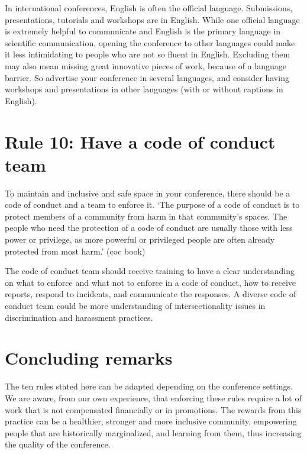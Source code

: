 \documentclass[10pt,letterpaper]{article}
\begin{document}
In international conferences, English is often the official language. Submissions, presentations, tutorials and workshops are in English. While one official language is extremely helpful to communicate and English is the primary language in scientific communication, opening the conference to other languages could make it less intimidating to people who are not so fluent in English. Excluding them may also mean missing great innovative pieces of work, because of a language barrier. So advertise your conference in several languages, and consider having workshops and presentations in other languages (with or without captions in English). 

\section*{Rule 10: Have a code of conduct team}

To maintain and inclusive and safe space in your conference, there should be a code of conduct and a team to enforce it. `The purpose of a code of conduct is to protect members of a community from harm in that community's spaces. The people who need the protection of a code of conduct are usually those with less power or privilege, as more powerful or privileged people are often already protected from most harm.' (coc book)

The code of conduct team should receive training to have a clear understanding on what to enforce and what not to enforce in a code of conduct, how to receive reports, respond to incidents, and communicate the responses. A diverse code of conduct team could be more understanding of intersectionality issues in discrimination and harassment practices. 


\section*{Concluding remarks}

The ten rules stated here can be adapted depending on the conference settings. We are aware, from our own experience, that enforcing these rules require a lot of work that is not compensated financially or in promotions. The rewards from this practice can be a healthier, stronger and more inclusive community, empowering people that are historically marginalized, and learning from them, thus increasing the quality of the conference. 
\end{document}
